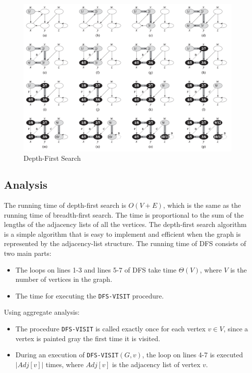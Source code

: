 \begin{figure}[H]
    \centering
    \includegraphics[width=\textwidth]{assets/dfs.png}
    \caption{Depth-First Search}
    \label{fig:dfs}
\end{figure}

\subsection*{Analysis}

The running time of depth-first search is $O(V + E)$, which is the same as the running time of breadth-first search. The time is proportional to the sum of the lengths of the adjacency lists of all the vertices. The depth-first search algorithm is a simple algorithm that is easy to implement and efficient when the graph is represented by the adjacency-list structure.
The running time of DFS consists of two main parts:
\begin{itemize}
    \item The loops on lines 1-3 and lines 5-7 of DFS take time $\Theta(V)$, where $V$ is the number of vertices in the graph.
    \item The time for executing the \texttt{DFS-VISIT} procedure.
\end{itemize}

Using aggregate analysis:
\begin{itemize}
    \item The procedure \texttt{DFS-VISIT} is called exactly once for each vertex $v \in V$, since a vertex is painted gray the first time it is visited.
    \item During an execution of \texttt{DFS-VISIT}$(G, v)$, the loop on lines 4-7 is executed $|Adj[v]|$ times, where $Adj[v]$ is the adjacency list of vertex $v$.
\end{itemize}

